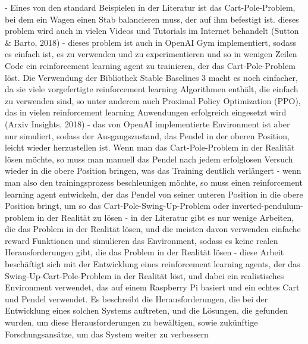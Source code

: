- Eines von den standard Beispielen in der Literatur ist das Cart-Pole-Problem, bei dem ein Wagen einen Stab balancieren muss, der auf ihm befestigt ist. dieses problem wird auch in vielen Videos und Tutorials im Internet behandelt (Sutton & Barto, 2018)
- dieses problem ist auch in OpenAI Gym implementiert, sodass es einfach ist, es zu verwenden und zu experimentieren und so in wenigen Zeilen Code ein reinforcement learning agent zu trainieren, der das Cart-Pole-Problem löst. Die Verwendung der Bibliothek Stable Baselines 3 macht es noch einfacher, da sie viele vorgefertigte reinforcement learning Algorithmen enthält, die einfach zu verwenden sind, so unter anderem auch Proximal Policy Optimization (PPO), das in vielen reinforcement learning Anwendungen erfolgreich eingesetzt wird (Arxiv Insights, 2018)
- das von OpenAI implementierte Environment ist aber nur simuliert, sodass der Ausgangszustand, das Pendel in der oberen Position, leicht wieder herzustellen ist. Wenn man das Cart-Pole-Problem in der Realität lösen möchte, so muss man manuell das Pendel nach jedem erfolglosen Versuch wieder in die obere Position bringen, was das Training deutlich verlängert
- wenn man also den trainingsprozess beschleunigen möchte, so muss einen reinforcement learning agent entwickeln, der das Pendel von seiner unteren Position in die obere Position bringt, um so das Cart-Pole-Swing-Up-Problem oder inverted-pendulum-problem in der Realität zu lösen
- in der Literatur gibt es nur wenige Arbeiten, die das Problem in der Realität lösen, und die meisten davon verwenden einfache reward Funktionen und simulieren das Environment, sodass es keine realen Herausforderungen gibt, die das Problem in der Realität lösen
- diese Arbeit beschäftigt sich mit der Entwicklung eines reinforcement learning agents, der das Swing-Up-Cart-Pole-Problem in der Realität löst, und dabei ein realistisches Environment verwendet, das auf einem Raspberry Pi basiert und ein echtes Cart und Pendel verwendet. Es beschreibt die Herausforderungen, die bei der Entwicklung eines solchen Systems auftreten, und die Lösungen, die gefunden wurden, um diese Herausforderungen zu bewältigen, sowie zukünftige Forschungsansätze, um das System weiter zu verbessern
